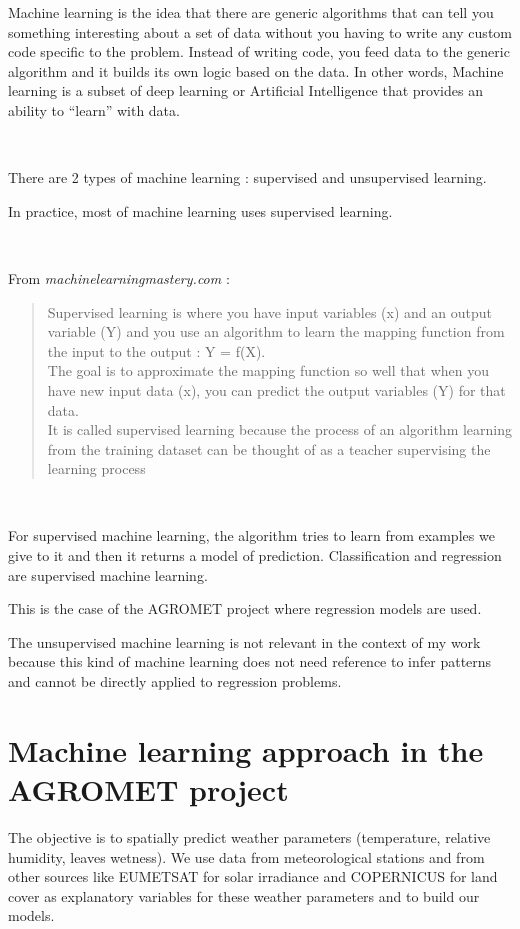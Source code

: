\documentclass[12pt,twoside]{reedthesis}
\theoremstyle{definition}
\theoremstyle{definition}
\theoremstyle{definition}
\theoremstyle{remark}
\begin{document}
Machine learning is the idea that there are generic algorithms that can
tell you something interesting about a set of data without you having to
write any custom code specific to the problem. Instead of writing code,
you feed data to the generic algorithm and it builds its own logic based
on the data. In other words, Machine learning is a subset of deep
learning or Artificial Intelligence that provides an ability to
``learn'' with data.

~

There are 2 types of machine learning : supervised and unsupervised
learning.

In practice, most of machine learning uses supervised learning.

~

From \emph{machinelearningmastery.com} :
\begin{quote}
Supervised learning is where you have input variables (x) and an output
variable (Y) and you use an algorithm to learn the mapping function from
the input to the output : Y = f(X).\\
The goal is to approximate the mapping function so well that when you
have new input data (x), you can predict the output variables (Y) for
that data.\\
It is called supervised learning because the process of an algorithm
learning from the training dataset can be thought of as a teacher
supervising the learning process
\end{quote}
~

For supervised machine learning, the algorithm tries to learn from
examples we give to it and then it returns a model of prediction.
Classification and regression are supervised machine learning.

This is the case of the AGROMET project where regression models are
used.

The unsupervised machine learning is not relevant in the context of my
work because this kind of machine learning does not need reference to
infer patterns and cannot be directly applied to regression problems.

\section{Machine learning approach in the AGROMET
project}\label{machine-learning-approach-in-the-agromet-project}

The objective is to spatially predict weather parameters (temperature,
relative humidity, leaves wetness). We use data from meteorological
stations and from other sources like EUMETSAT for solar irradiance and
COPERNICUS for land cover as explanatory variables for these weather
parameters and to build our models.
\end{document}

